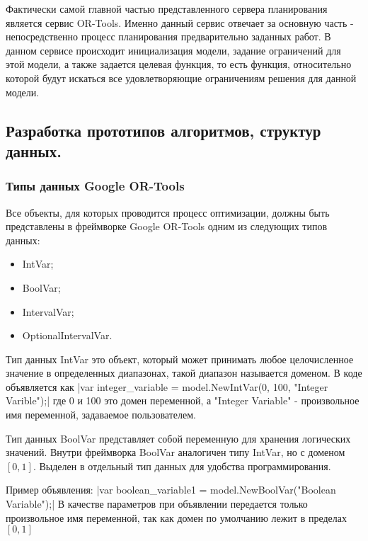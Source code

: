Фактически самой главной частью представленного сервера планирования является сервис OR-Tools. Именно данный сервис отвечает за основную часть - непосредственно процесс планирования предварительно заданных работ. В данном сервисе происходит инициализация модели, задание ограничений для этой модели, а также задается целевая функция, то есть функция, относительно которой будут искаться все удовлетворяющие ограничениям решения для данной модели.


\subsection{Разработка прототипов алгоритмов, структур данных.}

\subsubsection{Типы данных Google OR-Tools}

Все объекты, для которых проводится процесс оптимизации, должны быть представлены в фреймворке Google OR-Tools одним из следующих типов данных:

\begin{itemize}
	\item IntVar; 
	\item BoolVar;
	\item IntervalVar;
	\item OptionalIntervalVar.
\end{itemize}

Тип данных IntVar это объект, который может принимать любое целочисленное значение в определенных диапазонах, такой диапазон называется доменом. В коде объявляется как
|var integer_variable = model.NewIntVar(0, 100, "Integer Varible");|
где 0 и 100 это домен переменной, а "Integer Variable" - произвольное имя переменной, задаваемое пользователем.

Тип данных BoolVar представляет собой переменную для хранения логических значений. Внутри фреймворка BoolVar аналогичен типу IntVar, но с доменом $[0, 1]$. Выделен в отдельный тип данных для удобства программирования.

Пример объявления:
|var boolean_variable1 = model.NewBoolVar("Boolean Variable");|
В качестве параметров при объявлении передается только произвольное имя переменной, так как домен по умолчанию лежит в пределах $[0, 1]$

